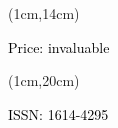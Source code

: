 \begin{titlepage}
	\begin{textblock*}{2cm}(1cm,14cm)
		\begin{rotate}{90}
			\sffamily\small \textcolor{black}{Price: invaluable}
		\end{rotate}
	\end{textblock*}


	\begin{textblock*}{2cm}(1cm,20cm)
		\begin{rotate}{90}
			\sffamily \textcolor{black}{ISSN: 1614-4295}
		\end{rotate}
	\end{textblock*}

\end{titlepage}
\newpage
